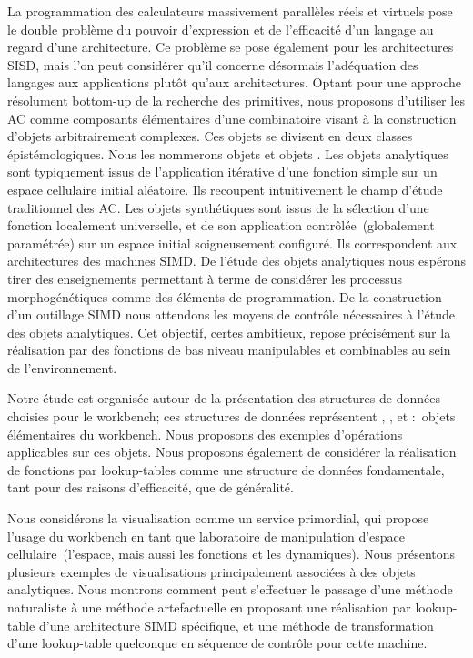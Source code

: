 La programmation des calculateurs massivement parall\`eles r\'eels et
virtuels pose le double probl\`eme du pouvoir d'expression et de
l'efficacit\'e d'un langage au regard d'une architecture. %
Ce probl\`eme se pose \'egalement pour les architectures SISD, mais l'on
peut consid\'erer qu'il concerne d\'esormais l'ad\'equation des langages aux
applications plut\^ot qu'aux architectures. %
Optant pour une approche r\'esolument bottom-up de la recherche des
primitives, nous proposons d'utiliser les AC comme composants
\'el\'ementaires d'une combinatoire visant \`a la construction d'objets
 arbitrairement complexes. %
Ces objets se divisent en deux classes \'epist\'emologiques. %
Nous les nommerons objets  et objets
. %
Les objets analytiques sont typiquement issus de l'application
it\'erative d'une fonction simple sur un espace cellulaire initial
al\'eatoire. %
Ils recoupent intuitivement le champ d'\'etude traditionnel des AC\@. %
Les objets synth\'etiques sont issus de la s\'election d'une fonction
localement universelle, et de son application contr\^ol\'ee~(globalement
param\'etr\'ee) sur un espace initial soigneusement configur\'e. %
Ils correspondent aux architectures des machines SIMD\@. %
De l'\'etude des objets analytiques nous esp\'erons tirer des
enseignements permettant \`a terme de consid\'erer les processus
morphog\'en\'etiques comme des \'el\'ements de programmation. %
De la construction d'un outillage SIMD nous attendons les moyens de
contr\^ole n\'ecessaires \`a l'\'etude des objets analytiques. %
Cet objectif, certes ambitieux, repose pr\'ecis\'ement sur la r\'ealisation
par  des fonctions de bas niveau manipulables
et combinables au sein de l'environnement. %

Notre \'etude est organis\'ee autour de la pr\'esentation des structures de
donn\'ees choisies pour le workbench; ces structures de donn\'ees
repr\'esentent , , et
:~objets \'el\'ementaires du workbench. %
Nous proposons des exemples d'op\'erations applicables sur ces objets. %
Nous proposons \'egalement de consid\'erer la r\'ealisation de fonctions par
lookup-tables comme une structure de donn\'ees fondamentale, tant pour
des raisons d'efficacit\'e, que de g\'en\'eralit\'e. %

Nous consid\'erons la visualisation comme un service primordial, qui
propose l'usage du workbench en tant que laboratoire de manipulation
d'espace cellulaire~(l'espace, mais aussi les fonctions et les
dynamiques). %
Nous pr\'esentons plusieurs exemples de visualisations principalement
associ\'ees \`a des objets analytiques. %
Nous montrons comment peut s'effectuer le passage d'une m\'ethode
naturaliste \`a une m\'ethode artefactuelle en proposant une r\'ealisation
par lookup-table d'une architecture SIMD sp\'ecifique, et une m\'ethode de
transformation d'une lookup-table quelconque en s\'equence de contr\^ole
pour cette machine. %

